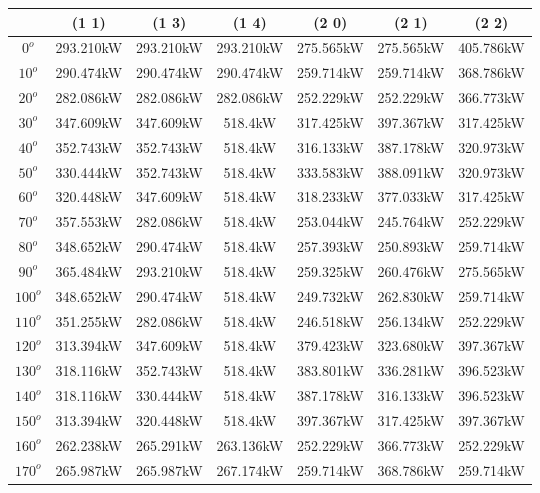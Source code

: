         \begin{table}[H]
        	\centering
        	\begin{tabular}{|c|c|c|c|c|c|c|} \hline
        			& (1 1)		& (1 3)		& (1 4)		& (2 0)		& (2 1)		& (2 2)		\\ \hline
		$0^o$	& 293.210kW	& 293.210kW	& 293.210kW	& 275.565kW	& 275.565kW	& 405.786kW	\\ \hline
		$10^o$	& 290.474kW	& 290.474kW	& 290.474kW	& 259.714kW	& 259.714kW	& 368.786kW	\\ \hline
		$20^o$	& 282.086kW	& 282.086kW	& 282.086kW	& 252.229kW	& 252.229kW	& 366.773kW	\\ \hline
		$30^o$	& 347.609kW	& 347.609kW	& 518.4kW	& 317.425kW	& 397.367kW	& 317.425kW	\\ \hline
		$40^o$	& 352.743kW	& 352.743kW	& 518.4kW	& 316.133kW	& 387.178kW	& 320.973kW	\\ \hline
		$50^o$	& 330.444kW	& 352.743kW	& 518.4kW	& 333.583kW	& 388.091kW	& 320.973kW	\\ \hline
		$60^o$	& 320.448kW	& 347.609kW	& 518.4kW	& 318.233kW	& 377.033kW	& 317.425kW	\\ \hline
		$70^o$	& 357.553kW	& 282.086kW	& 518.4kW	& 253.044kW	& 245.764kW	& 252.229kW	\\ \hline
		$80^o$	& 348.652kW	& 290.474kW	& 518.4kW	& 257.393kW	& 250.893kW	& 259.714kW	\\ \hline
		$90^o$	& 365.484kW	& 293.210kW	& 518.4kW	& 259.325kW	& 260.476kW	& 275.565kW	\\ \hline
		$100^o$	& 348.652kW	& 290.474kW	& 518.4kW	& 249.732kW	& 262.830kW	& 259.714kW	\\ \hline
		$110^o$	& 351.255kW	& 282.086kW	& 518.4kW	& 246.518kW	& 256.134kW	& 252.229kW	\\ \hline
		$120^o$	& 313.394kW	& 347.609kW	& 518.4kW	& 379.423kW	& 323.680kW	& 397.367kW	\\ \hline
		$130^o$	& 318.116kW	& 352.743kW	& 518.4kW	& 383.801kW	& 336.281kW	& 396.523kW	\\ \hline
		$140^o$	& 318.116kW	& 330.444kW	& 518.4kW	& 387.178kW	& 316.133kW	& 396.523kW	\\ \hline
		$150^o$	& 313.394kW	& 320.448kW	& 518.4kW	& 397.367kW	& 317.425kW	& 397.367kW	\\ \hline
		$160^o$	& 262.238kW	& 265.291kW	& 263.136kW	& 252.229kW	& 366.773kW	& 252.229kW	\\ \hline
		$170^o$	& 265.987kW	& 265.987kW	& 267.174kW	& 259.714kW	& 368.786kW	& 259.714kW	\\ \hline

\end{tabular}
\end{table}

